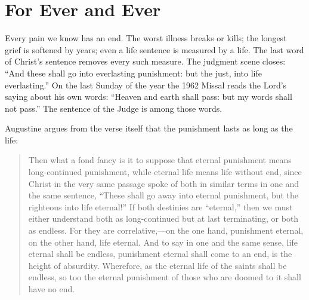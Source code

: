 \section{For Ever and Ever}

Every pain we know has an end. The worst illness breaks or kills; the longest grief is softened by years; even a life sentence is measured by a life. The last word of Christ's sentence removes every such measure. The judgment scene closes: ``And these shall go into everlasting punishment: but the just, into life everlasting.'' On the last Sunday of the year the 1962 Missal reads the Lord's saying about his own words: ``Heaven and earth shall pass: but my words shall not pass.'' The sentence of the Judge is among those words.

Augustine argues from the verse itself that the punishment lasts as long as the life:

\begin{quote}
Then what a fond fancy is it to suppose that eternal punishment means long-continued punishment, while eternal life means life without end, since Christ in the very same passage spoke of both in similar terms in one and the same sentence, ``These shall go away into eternal punishment, but the righteous into life eternal!'' If both destinies are ``eternal,'' then we must either understand both as long-continued but at last terminating, or both as endless. For they are correlative,---on the one hand, punishment eternal, on the other hand, life eternal. And to say in one and the same sense, life eternal shall be endless, punishment eternal shall come to an end, is the height of absurdity. Wherefore, as the eternal life of the saints shall be endless, so too the eternal punishment of those who are doomed to it shall have no end.
\end{quote}

